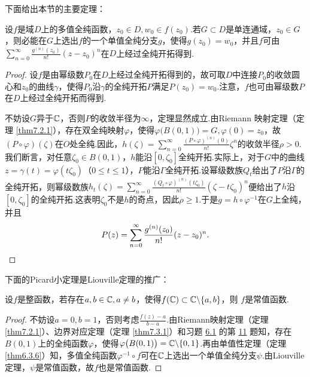 下面给出本节的主要定理：
\begin{theorem}\label{thm6.3.6}
  设$f$是域$D$上的多值全纯函数，$z_0\in D,w_0\in f(z_0)$.若$G\subset D$是单连通域，$z_0\in G$，则必能在$G$上选出$f$的一个单值全纯分支$g$，使得$g(z_0)=w_0$，并且$f$可由$\sum_{n=0}^\infty\frac{g^{(n)}(z_0)}{n!}(z-z_0)^n$在$D$上经过全纯开拓得到.
\end{theorem}
\begin{proof}
  设$f$是由幂级数$P_0$在$D$上经过全纯开拓得到的，故可取$D$中连接$P_0$的收敛圆心和$z_0$的曲线$\gamma$，使得$P_0$沿$\gamma$的全纯开拓$P$满足$P(z_0)=w_0$.注意，$f$也可由幂级数$P$在$D$上经过全纯开拓而得到.

  不妨设$G$异于$\mathbb C$，否则$P$的收敛半径为$\infty$，定理显然成立.由Riemann 映射定理（定理 \ref{thm7.2.1}），存在双全纯映射$\varphi$，使得$\varphi\big(B(0,1)\big)=G,\varphi(0)=z_0$，故$(P\circ\varphi)(\zeta)$在$O$处全纯.因此，$h(\zeta)=\sum_{n=0}^\infty\frac{(P\circ\varphi)^{(n)}(0)}{n!}\zeta^n$的收敛半径$\rho>0$.我们断言，对任意$\zeta_0\in B(0,1)$，$h$能沿$[0,\zeta_0]$全纯开拓.实际上，对于$G$中的曲线$z=\gamma(t)=\varphi(t\zeta_0)$（$0\le t\le1$），$P$能沿$\Gamma$全纯开拓.设幂级数族$Q_t$给出了$P$沿$\Gamma$的全纯开拓，则幂级数族$h_t(\zeta)=\sum_{n=0}^\infty\frac{(Q_t\circ\varphi)^{(n)}(t\zeta_0)}{n!}(\zeta-t\zeta_0)^n$便给出了$h$沿$[0,\zeta_0]$的全纯开拓.这表明$\zeta_0$不是$h$的奇点，因此$\rho\ge1$.于是$g=h\circ\varphi^{-1}$在$G$上全纯，并且
  \begin{equation*}
    P(z) = \sum_{n=0}^\infty\frac{g^{(n)}(z_0)}{n!}(z-z_0)^n. \qedhere
  \end{equation*}
\end{proof}

下面的Picard小定理是Liouville定理的推广：
\begin{theorem}\label{thm6.3.7}
  设$f$是整函数，若存在$a,b\in\mathbb C,a\ne b$，使得$f(\mathbb C)\subset\mathbb C\backslash\{a,b\}$，则
$f$是常值函数.
\end{theorem}
\begin{proof}
  不妨设$a=0,b=1$，否则考虑$\frac{f(z)-a}{b-a}$.由Riemann映射定理（定理 \ref{thm7.2.1}）、边界对应定理（定理 \ref{thm7.3.1}）和习题 \hyperlink{xiti6.1}{6.1} 的第 \hyperlink{xiti6.1.11}{11} 题知，存在$B(0,1)$上的全纯函数$\varphi$，使得$\varphi\big(B(0,1)\big)=\mathbb C\backslash\{0,1\}$.再由单值性定理（定理 \ref{thm6.3.6}）知，多值全纯函数$\varphi^{-1}\circ f$可在$\mathbb C$上选出一个单值全纯分支$\psi$.由Liouville定理，$\psi$是常值函数，故$f$也是常值函数.
\end{proof}

